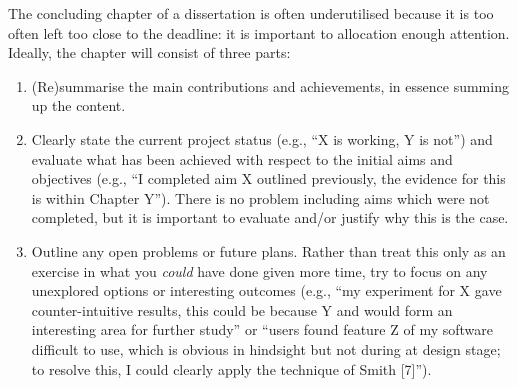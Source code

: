 \documentclass[ %
                    author={Manan Vaswani},
                supervisor={Dr. Raphael Clifford},
                    degree={MEng},
                     title={A multi-core CPU implementation \n of the classical Boson Sampling algorithm},
                  subtitle={},
                      type={},
                      year={2019} ]{dissertation}
\begin{document}
\noindent
The concluding chapter of a dissertation is often underutilised because it 
is too often left too close to the deadline: it is important to allocation
enough attention.  Ideally, the chapter will consist of three parts:

\begin{enumerate}
\item (Re)summarise the main contributions and achievements, in essence
      summing up the content.
\item Clearly state the current project status (e.g., ``X is working, Y 
      is not'') and evaluate what has been achieved with respect to the 
      initial aims and objectives (e.g., ``I completed aim X outlined 
      previously, the evidence for this is within Chapter Y'').  There 
      is no problem including aims which were not completed, but it is 
      important to evaluate and/or justify why this is the case.
\item Outline any open problems or future plans.  Rather than treat this
      only as an exercise in what you {\em could} have done given more 
      time, try to focus on any unexplored options or interesting outcomes
      (e.g., ``my experiment for X gave counter-intuitive results, this 
      could be because Y and would form an interesting area for further 
      study'' or ``users found feature Z of my software difficult to use,
      which is obvious in hindsight but not during at design stage; to 
      resolve this, I could clearly apply the technique of Smith [7]'').
\end{enumerate}


%
%

\backmatter



\end{document}
